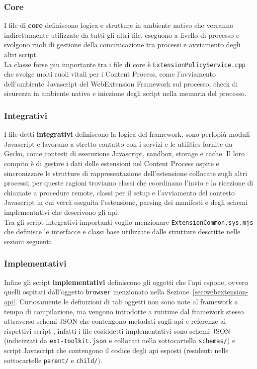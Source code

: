 \documentclass{sapthesis}
\newcommand{\bold}[1]{\textbf{#1}}
\newcommand{\code}[1]{\texttt{#1}}
\newcommand{\file}[1]{\code{#1}}
\newcommand{\Sezione}[1]{Sezione~\ref{#1}}
\newcommand{\JS}{Javascript}
\newcommand{\json}{JSON}
\begin{document}
        \subsubsection{Core}
        I file di \bold{core} definiscono logica e strutture in ambiente nativo che verranno indirettamente utilizzate da
        tutti gli altri file, eseguono a livello di processo e svolgono ruoli di gestione della comunicazione tra
        processi e avviamento degli altri script.\\
        La classe forse piu importante tra i file di core è \file{ExtensionPolicyService.cpp} che svolge molti ruoli
        vitali per i Content Process, come l'avviamento dell'ambiente \JS{} del WebExtension Framework sul processo,
        check di sicurezza in ambiente nativo e iniezione degli script nella memoria del processo.\\
        \subsubsection{Integrativi}
        I file detti \bold{integrativi} definiscono la logica del framework, sono perlopiù moduli \JS{}
        e lavorano a stretto contatto con i servizi e le utilities fornite da Gecko, come contesti di esecuzione \JS{}, sandbox, storage
        e cache. Il loro compito è di gestire i dati delle estensioni nel Content Process ospite e sincronizzare le strutture
        di rappresentazione dell'estensione collocate sugli altri processi; per queste ragioni troviamo classi che
        coordinano l'invio e la ricezione di chiamate a procedure remote, classi per il setup e l'avviamento
        del contesto \JS{} in cui verrà eseguita l'estensione, parsing dei manifesti e degli schemi implementativi
        che descrivono gli api. \\
        Tra gli script integrativi importanti voglio menzionare \file{ExtensionCommon.sys.mjs}
        che definisce le interfacce e classi base utilizzate dalle strutture descritte nelle sezioni seguenti.\\
        \subsubsection{Implementativi}
        Infine gli script \bold{implementativi} definiscono gli oggetti che l'api espone, ovvero quelli ospitati
        dall'oggetto \code{browser} menzionato nella \Sezione{sec:webextension-api}. Curiosamente le definizioni di tali
        oggetti non sono note al framework a tempo di compilazione, ma vengono introdotte a runtime dal framework stesso attraverso
        schemi \json{} che contengono metadati sugli api e referenze ai rispettivi script \cite{webextension-api-development}, infatti i file cosiddetti implementativi
        sono schemi \json{} (indicizzati da \file{ext-toolkit.json} e collocati nella sottocartella \file{schemas/}) e script \JS{}
        che contengono il codice degli api esposti (residenti nelle sottocartelle \file{parent/} e \file{child/}).
\end{document}
